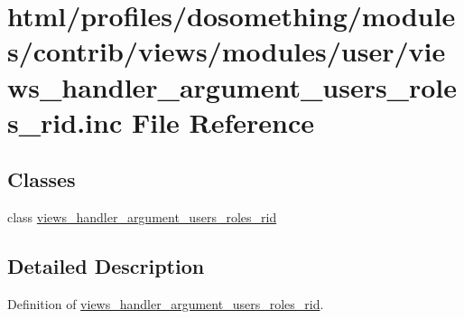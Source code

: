 \hypertarget{views__handler__argument__users__roles__rid_8inc}{
\section{html/profiles/dosomething/modules/contrib/views/modules/user/views\_\-handler\_\-argument\_\-users\_\-roles\_\-rid.inc File Reference}
\label{views__handler__argument__users__roles__rid_8inc}
}
\subsection*{Classes}
\begin{DoxyCompactItemize}
\item 
class \hyperlink{classviews__handler__argument__users__roles__rid}{views\_\-handler\_\-argument\_\-users\_\-roles\_\-rid}
\end{DoxyCompactItemize}


\subsection{Detailed Description}
Definition of \hyperlink{classviews__handler__argument__users__roles__rid}{views\_\-handler\_\-argument\_\-users\_\-roles\_\-rid}. 